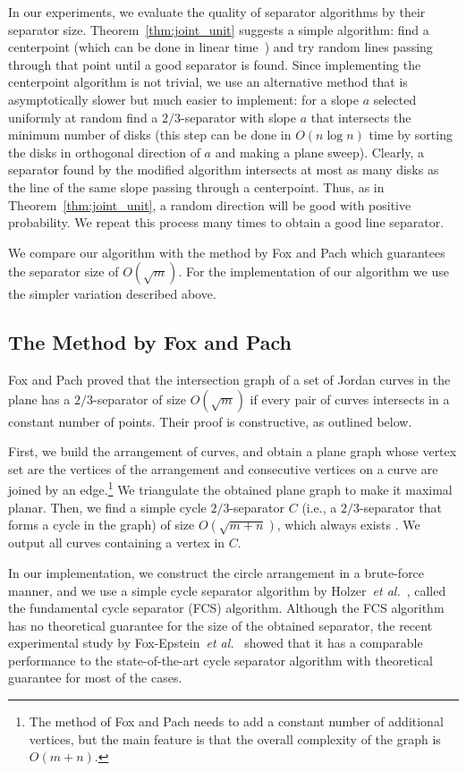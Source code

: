 \documentclass{llncs}
\newcommand{\etal}{\textit{et al.}}
\begin{document}
In our experiments, we evaluate the quality of separator algorithms
by their separator size. Theorem~\ref{thm:joint_unit} suggests a simple algorithm: find a centerpoint (which can be done in linear time~\cite{DBLP:journals/dcg/JadhavM94}) and try random lines passing through that point until a good separator is found. Since implementing the centerpoint algorithm is not trivial, we use an alternative method that is asymptotically slower but much easier to implement: for a slope $a$ selected uniformly at random find a $2/3$-separator with slope $a$ that intersects the minimum number of disks (this step can be done in $O(n \log n)$ time by sorting the disks in orthogonal direction of $a$ and making a plane sweep). 
 Clearly, a separator found by the modified algorithm intersects at most as many disks as the line of the same slope passing through a centerpoint. Thus, as in Theorem~\ref{thm:joint_unit}, a random direction will be good with positive probability. 
We repeat this process many times to obtain a good line separator.

We compare our algorithm with the method by Fox and Pach \cite{Fox20081070}
which guarantees the separator size of $O(\sqrt{m})$. For the implementation of our algorithm we use the simpler variation described above. 

\subsection{The Method by Fox and Pach}
Fox and Pach \cite{Fox20081070} proved that the intersection graph
of a set of Jordan curves in the plane has a $2/3$-separator of size
$O(\sqrt{m})$ if every pair of curves intersects in a constant number 
of points.
Their proof is constructive, as outlined below.

First, we build the arrangement of curves, and obtain a plane graph whose vertex set are the vertices of the arrangement and consecutive vertices on a curve are joined
by an edge.\footnote{The method of Fox and Pach needs to add a constant number of additional vertices, but the main feature is that the overall complexity of the graph is $O(m+n)$.}
We triangulate the obtained plane graph to make it maximal
planar.
Then, we find a simple cycle $2/3$-separator $C$ 
(i.e., a $2/3$-separator that forms a cycle in the graph)
of size $O(\sqrt{m+n})$,
which always exists \cite{DBLP:journals/jcss/Miller86}.
We output all curves containing a vertex in $C$.

In our implementation, we construct the circle arrangement in a brute-force manner, and we use a simple cycle separator algorithm
by Holzer~\etal~\cite{DBLP:journals/jea/HolzerSWPZ09}, called the
fundamental cycle separator (FCS) algorithm.
Although the FCS algorithm has no theoretical guarantee for the size
of the obtained separator, the recent experimental study by 
Fox-Epstein~\etal~\cite{DBLP:journals/jea/Fox-EpsteinMP016} showed 
that it has a comparable
performance to the state-of-the-art cycle separator algorithm with
theoretical guarantee for most of the cases.
\end{document}
